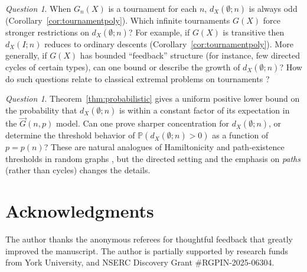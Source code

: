 \documentclass[12pt]{amsart}
\theoremstyle{definition}
\theoremstyle{remark}
\newtheorem{question}[theorem]{Question}
\begin{document}
\begin{question} When $G_n(X)$ is a tournament for each $n$, $d_X(\emptyset;n)$ is always odd
(Corollary~\ref{cor:tournamentpoly}).  Which infinite tournaments $G(X)$ force stronger restrictions on
$d_X(\emptyset;n)$?
For example, if $G(X)$ is transitive then $d_X(I;n)$ reduces to ordinary descents (Corollary~\ref{cor:tournamentpoly}).
More generally, if $G(X)$ has bounded ``feedback'' structure (for instance, few directed cycles of certain types), can
one bound or describe the growth of $d_X(\emptyset;n)$?
How do such questions relate to classical extremal problems on tournaments \cite{moon-tournaments}?
\end{question}

\begin{question}Theorem~\ref{thm:probabilistic} gives a uniform positive lower bound on the probability that
$d_X(\emptyset;n)$ is within a constant factor of its expectation in the $\vec{G}(n,p)$ model.
Can one prove sharper concentration for $d_X(\emptyset;n)$, or determine the threshold behavior of
$\mathbb{P}(d_X(\emptyset;n)>0)$ as a function of $p=p(n)$?
These are natural analogues of Hamiltonicity and path-existence thresholds in random graphs
\cite{janson-randomgraphs,alon-spencer}, but the directed setting and the emphasis on \emph{paths} (rather than cycles)
changes the details.
\end{question}

\section*{Acknowledgments}
The author thanks the anonymous referees for thoughtful feedback that greatly improved the manuscript. The author is partially supported by research funds from York University, and NSERC Discovery Grant \#RGPIN-2025-06304.

\bigskip
\end{document}
